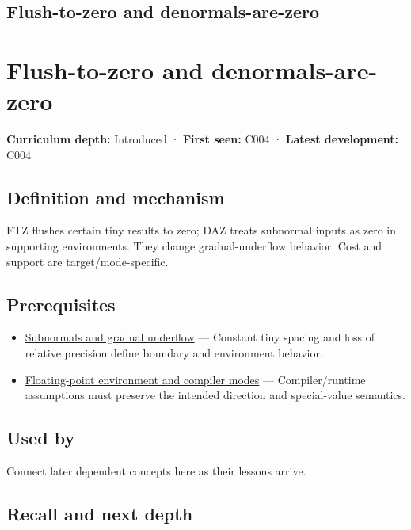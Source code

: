 \hypertarget{appendix-e979eb012782}{}
\section*{Flush-to-zero and denormals-are-zero}
\chapter{Flush-to-zero and denormals-are-zero}\label{appendix-e979eb012782-flush-to-zero-and-denormals-are-zero}

\textbf{Curriculum depth:} Introduced · \textbf{First seen:} C004 · \textbf{Latest development:} C004

\section{Definition and mechanism}\label{appendix-e979eb012782-definition-and-mechanism}

FTZ flushes certain tiny results to zero; DAZ treats subnormal inputs as zero in supporting environments. They change gradual-underflow behavior. Cost and support are target/mode-specific.

\section{Prerequisites}\label{appendix-e979eb012782-prerequisites}

\begin{itemize}
\tightlist
\item
  \hyperref[appendix-00a6e044c437]{Subnormals and gradual underflow} --- Constant tiny spacing and loss of relative precision define boundary and environment behavior.
\item
  \hyperref[appendix-f11d1a521253]{Floating-point environment and compiler modes} --- Compiler/runtime assumptions must preserve the intended direction and special-value semantics.
\end{itemize}

\section{Used by}\label{appendix-e979eb012782-used-by}

Connect later dependent concepts here as their lessons arrive.

\section{Recall and next depth}\label{appendix-e979eb012782-recall-and-next-depth}

